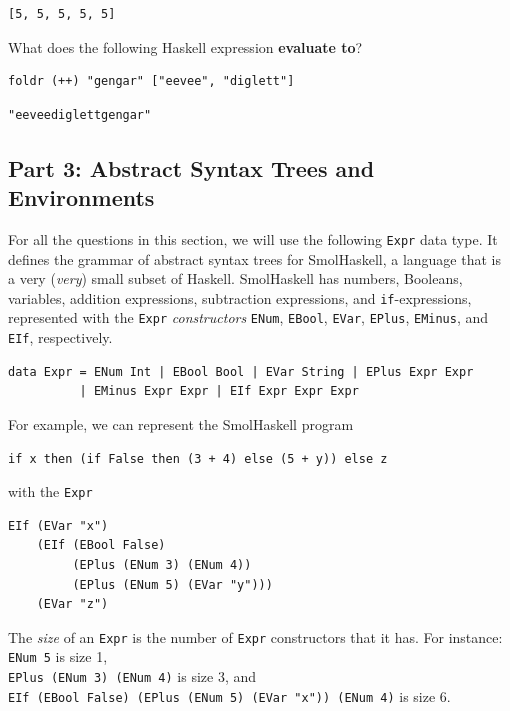 \documentclass[addpoints]{exam}
\begin{document}
\begin{questions}
\begin{solutionorbox}[1.5in]
\begin{verbatim}
[5, 5, 5, 5, 5]
\end{verbatim}
\end{solutionorbox}

\question[5] What does the following Haskell expression \textbf{evaluate to}?

\begin{verbatim}
foldr (++) "gengar" ["eevee", "diglett"]
\end{verbatim}

\begin{solutionorbox}[1.5in]
\begin{verbatim}
"eeveediglettgengar"
\end{verbatim}
\end{solutionorbox}

\newpage

\subsection*{\textbf{Part 3: Abstract Syntax Trees and Environments}}

\noindent For all the questions in this section, we will use the following \verb|Expr| data type.  It defines the grammar of abstract syntax trees for SmolHaskell, a language that is a very (\emph{very}) small subset of Haskell.  SmolHaskell has numbers, Booleans, variables, addition expressions, subtraction expressions, and \verb|if|-expressions, represented with the \verb|Expr| \emph{constructors} \verb|ENum|, \verb|EBool|, \verb|EVar|, \verb|EPlus|, \verb|EMinus|, and \verb|EIf|, respectively.

\begin{verbatim}
data Expr = ENum Int | EBool Bool | EVar String | EPlus Expr Expr
          | EMinus Expr Expr | EIf Expr Expr Expr
\end{verbatim}

For example, we can represent the SmolHaskell program
\begin{verbatim}
if x then (if False then (3 + 4) else (5 + y)) else z
\end{verbatim}
with the \verb |Expr| 
\begin{verbatim}
EIf (EVar "x")
    (EIf (EBool False)
         (EPlus (ENum 3) (ENum 4))
         (EPlus (ENum 5) (EVar "y")))
    (EVar "z")
\end{verbatim}
The \emph{size} of an \verb|Expr| is the number of \verb|Expr| constructors that it has.  For instance:\\
\verb|ENum 5| is size 1,\\
\verb|EPlus (ENum 3) (ENum 4)| is size 3, and \\
\verb|EIf (EBool False) (EPlus (ENum 5) (EVar "x")) (ENum 4)| is size 6.


\end{questions}
\end{document}
